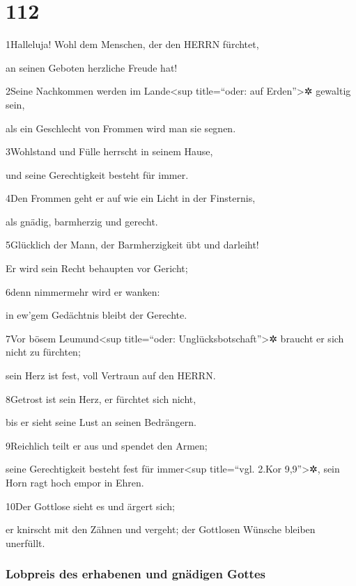 \hypertarget{section-111}{%
\section{112}\label{section-111}}

1Halleluja! Wohl dem Menschen, der den HERRN fürchtet,

an seinen Geboten herzliche Freude hat!

2Seine Nachkommen werden im Lande\textless sup title=``oder: auf
Erden''\textgreater✲ gewaltig sein,

als ein Geschlecht von Frommen wird man sie segnen.

3Wohlstand und Fülle herrscht in seinem Hause,

und seine Gerechtigkeit besteht für immer.

4Den Frommen geht er auf wie ein Licht in der Finsternis,

als gnädig, barmherzig und gerecht.

5Glücklich der Mann, der Barmherzigkeit übt und darleiht!

Er wird sein Recht behaupten vor Gericht;

6denn nimmermehr wird er wanken:

in ew'gem Gedächtnis bleibt der Gerechte.

7Vor bösem Leumund\textless sup title=``oder:
Unglücksbotschaft''\textgreater✲ braucht er sich nicht zu fürchten;

sein Herz ist fest, voll Vertraun auf den HERRN.

8Getrost ist sein Herz, er fürchtet sich nicht,

bis er sieht seine Lust an seinen Bedrängern.

9Reichlich teilt er aus und spendet den Armen;

seine Gerechtigkeit besteht fest für immer\textless sup title=``vgl.
2.Kor 9,9''\textgreater✲, sein Horn ragt hoch empor in Ehren.

10Der Gottlose sieht es und ärgert sich;

er knirscht mit den Zähnen und vergeht; der Gottlosen Wünsche bleiben
unerfüllt.

\hypertarget{lobpreis-des-erhabenen-und-gnuxe4digen-gottes}{%
\subsubsection{Lobpreis des erhabenen und gnädigen
Gottes}\label{lobpreis-des-erhabenen-und-gnuxe4digen-gottes}}

